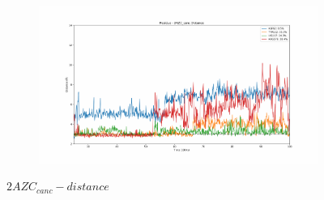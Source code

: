 \documentclass[fleqn,10pt]{wlscirep}
\begin{document}
\begin{figure}[!ht]
\begin{subfigure}{.45\textwidth}
  \end{subfigure}
    \begin{subfigure}{.45\textwidth}
     \centering
     \includegraphics[width=.95\linewidth]{2AZC_canc/2AZC_canc-dist_4.pdf}
  \end{subfigure}
\caption{$2AZC_{canc}-distance$}
\label{sup:2AZC_canc-dist}
\end{figure}  
\end{document}
